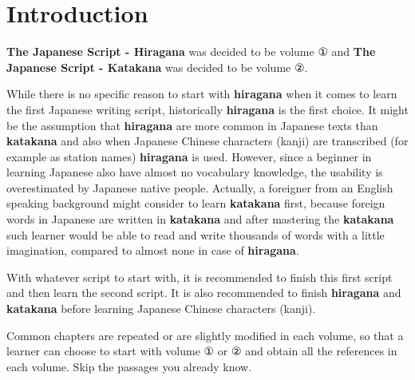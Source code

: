 \chapter*{Introduction}
\label{chap:Introduction}

\textbf{The Japanese Script - Hiragana} was decided to be volume ①  and
\textbf{The Japanese Script - Katakana} was decided to be volume ②.
%
%

While there is no specific reason to start with \textbf{hiragana} when it comes
to learn the first Japanese writing script, historically \textbf{hiragana} is
the first choice. It might be the assumption that \textbf{hiragana} are more
common in Japanese texts than \textbf{katakana} and also when Japanese Chinese
characters (kanji) are transcribed (for example as station names)
\textbf{hiragana} is used. However, since a beginner in learning Japanese also
have almost no vocabulary knowledge, the usability is overestimated by Japanese
native people. Actually, a foreigner from an English speaking background might
consider to learn \textbf{katakana} first, because foreign words in Japanese
are written in \textbf{katakana} and after mastering the \textbf{katakana} such
learner would be able to read and write thousands of words with a little
imagination, compared to almost none in case of \textbf{hiragana}.

With whatever script to start with, it is recommended to finish this first
script and then learn the second script. It is also recommended to finish
\textbf{hiragana} and \textbf{katakana} before learning Japanese Chinese
characters (kanji).

Common chapters are repeated or are slightly modified in each volume, so that a
learner can choose to start with volume ①  or ②  and obtain all the references
in each volume. Skip the passages you already know.


